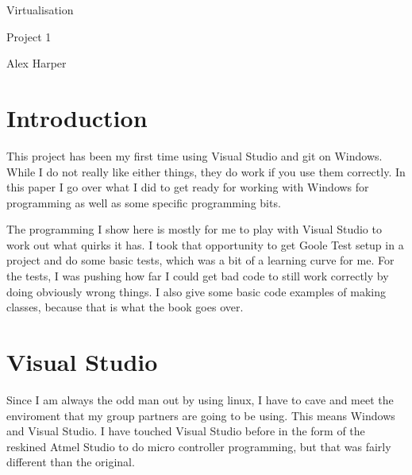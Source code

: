 \documentclass[12pt]{article}
\begin{document}
\begin{titlepage}
	\centering
	{\Huge Virtualisation\par}
	\vspace{0.25in}
	{\Large Project 1\par}
	\vspace{2in}
	{Alex Harper\par}
	\newpage
\end{titlepage}
\tableofcontents
\newpage

\listoffigures
\newpage
\setlength{\parindent}{4em} %
\setlength{\parskip}{1em} %




\section{Introduction}

This project has been my first time using Visual Studio and git on Windows.
While I do not really like either things, they do work if you use them correctly.
In this paper I go over what I did to get ready for working with Windows for programming as well as some specific programming bits.

The programming I show here is mostly for me to play with Visual Studio to work out what quirks it has.
I took that opportunity to get Goole Test setup in a project and do some basic tests, which was a bit of a learning curve for me.
For the tests, I was pushing how far I could get bad code to still work correctly by doing obviously wrong things.
I also give some basic code examples of making classes, because that is what the book goes over.

\section{Visual Studio}

Since I am always the odd man out by using linux, I have to cave and meet the enviroment that my group partners are going to be using.
This means Windows and Visual Studio.
I have touched Visual Studio before in the form of the reskined Atmel Studio to do micro controller programming, but that was fairly different than the original.
\end{document}
